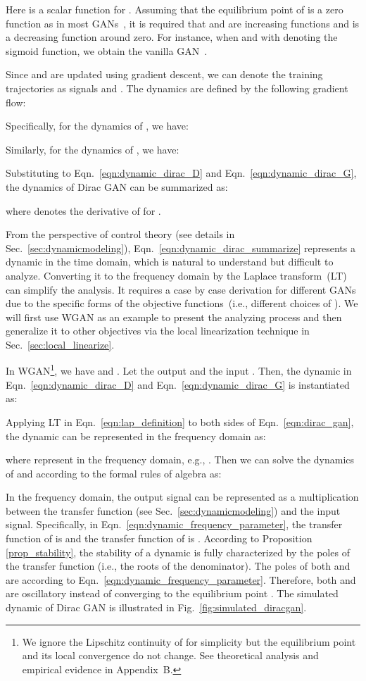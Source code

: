 \documentclass{article}
\newcommand{\fig}[1]{Fig.~\ref{fig:#1}}
\newcommand{\eqn}[1]{Eqn.~\eqref{eqn:#1}}
\newcommand{\secref}[1]{Sec.~\ref{sec:#1}} \usepackage{wrapfig}
\theoremstyle{definition}
\begin{document}
Here  is a scalar function for .  
Assuming that the equilibrium point of  is a zero function as in most GANs~\cite{goodfellow2014generative,arjovsky2017wasserstein}, it is required that  and  are increasing functions and  is a decreasing function around zero. For instance, when  and  with  denoting the sigmoid function, we obtain the vanilla GAN~\cite{goodfellow2014generative}.



Since  and  are updated using gradient descent, we can denote the training trajectories as signals  and . The dynamics are defined by the following gradient flow:

Specifically, for the dynamics of , we have:

Similarly, for the dynamics of , we have:

Substituting  to \eqn{dynamic_dirac_D} and \eqn{dynamic_dirac_G}, the dynamics of Dirac GAN can be summarized as:

where  denotes the derivative of  for .


From the perspective of control theory (see details in \secref{dynamicmodeling}), \eqn{dynamic_dirac_summarize} represents a dynamic in the time domain, which is natural to understand but difficult to analyze. Converting it to the frequency domain by the Laplace transform~(LT) can simplify the analysis. It requires a case by case derivation for different GANs due to the specific forms of the objective functions~(i.e., different choices of ).
We will first use WGAN as an example to present the analyzing process and then generalize it to other objectives via the local linearization technique in \secref{local_linearize}.



In WGAN\footnote{We ignore the Lipschitz continuity of  for simplicity but the equilibrium point and its local convergence do not change. See theoretical analysis and empirical evidence in Appendix~B.}, we have  and . Let the output  and the input . Then, the dynamic in \eqn{dynamic_dirac_D} and \eqn{dynamic_dirac_G} is instantiated as:

Applying LT  in \eqn{lap_definition} to both sides of \eqn{dirac_gan}, the dynamic can be represented in the frequency domain as:

where  represent  in the frequency domain, e.g., .
Then we can solve the dynamics of  and  according to the formal rules of algebra as:

In the frequency domain, the output signal can be represented as a multiplication between the transfer function (see \secref{dynamicmodeling}) and the input signal.
Specifically, in \eqn{dynamic_frequency_parameter}, the transfer function of  is  and the transfer function of  is .
According to Proposition \ref{prop_stability}, the stability of a dynamic is fully characterized by the poles of the transfer function (i.e., the roots of the denominator).
The poles of both  and  are  according to \eqn{dynamic_frequency_parameter}. Therefore, both  and  are oscillatory instead of converging to the equilibrium point . The simulated dynamic of Dirac GAN is illustrated in \fig{simulated_diracgan}. 
\end{document}

